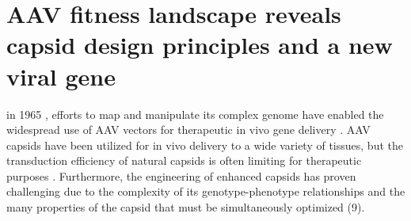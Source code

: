 
\chapter{AAV fitness landscape reveals capsid design principles and a new viral gene}




 in 1965 \cite{ATCHISON1965}, efforts to map and manipulate its complex genome have enabled the widespread use of AAV vectors for therapeutic in vivo gene delivery \cite{Grimm2015, Hastie2015, Srivastava1983, Pereira1997, Wu2006,Russell2017}. AAV capsids have been utilized for in vivo delivery to a wide variety of tissues, but the transduction efficiency of natural capsids is often limiting for therapeutic purposes \cite{Wu2006}. Furthermore, the engineering of enhanced capsids has proven challenging due to the complexity of its genotype-phenotype relationships and the many properties of the capsid that must be simultaneously optimized (9). 

